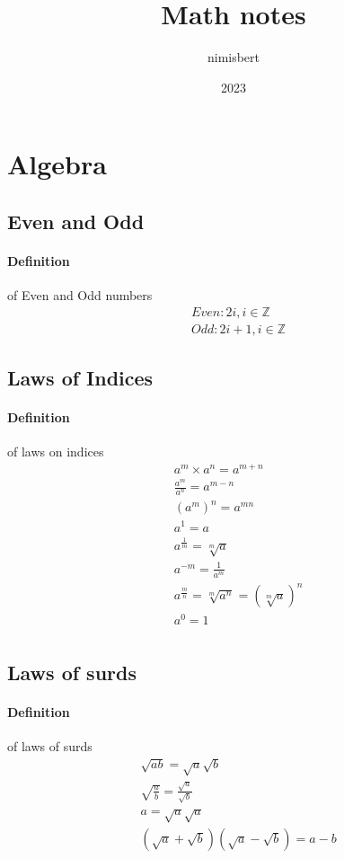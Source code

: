 \documentclass{article}
\title{Math notes}
\date{2023}
\author{nimisbert}
\begin{document}
\maketitle
\newpage

\section{Algebra}
\subsection{Even and Odd}
\paragraph{Definition}of Even and Odd numbers
\begin{align}
& Even : 2i, i \in \mathbb{Z} \\
& Odd : 2i+1, i \in \mathbb{Z} 
\end{align}

\subsection{Laws of Indices}
\paragraph{Definition}of laws on indices
\begin{align}
& a^m \times a^n = a^{m+n}  \\
& \frac{a^m}{a^n} = a^{m-n} \\
& (a^m)^n = a^{mn} \\
& a^1 = a \\
& a^{\frac{1}{m}} = \sqrt[m]{a} \\
& a^{-m} = \frac{1}{a^m} \\
& a^{\frac{m}{n}} = \sqrt[m]{a^n} = (\sqrt[m]{a})^n \\
& a^0 = 1 \\
\end{align}

\subsection{Laws of surds}
\paragraph{Definition}of laws of surds
\begin{align}
& \sqrt{ab} = \sqrt{a}\sqrt{b} \\
& \sqrt{\frac{a}{b}} = \frac{\sqrt{a}}{\sqrt{b}} \\
& a = \sqrt{a}\sqrt{a} \\
& (\sqrt{a} + \sqrt{b})(\sqrt{a} - \sqrt{b}) = a - b \\
\end{align}
\end{document}
